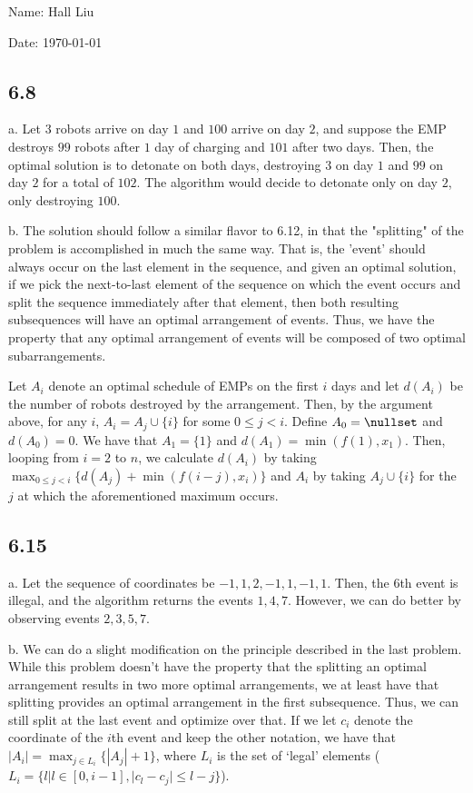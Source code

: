 \documentclass{article}
\begin{document}
Name: Hall Liu

Date: \today 

\subsection*{6.8}
a. Let $3$ robots arrive on day $1$ and $100$ arrive on day $2$, and suppose the EMP destroys $99$ robots after $1$ day of charging and $101$ after two days. Then, the optimal solution is to detonate on both days, destroying $3$ on day $1$ and $99$ on day $2$ for a total of $102$. The algorithm would decide to detonate only on day $2$, only destroying $100$.

\noindent b. The solution should follow a similar flavor to 6.12, in that the "splitting" of the problem is accomplished in much the same way. That is, the 'event' should always occur on the last element in the sequence, and given an optimal solution, if we pick the next-to-last element of the sequence on which the event occurs and split the sequence immediately after that element, then both resulting subsequences will have an optimal arrangement of events. Thus, we have the property that any optimal arrangement of events will be composed of two optimal subarrangements.

Let $A_i$ denote an optimal schedule of EMPs on the first $i$ days and let $d(A_i)$ be the number of robots destroyed by the arrangement. Then, by the argument above, for any $i$, $A_i=A_j\cup\{i\}$ for some $0\leq j<i$. Define $A_0=\nullset$ and $d(A_0)=0$. We have that $A_1=\{1\}$ and $d(A_1)=\min(f(1),x_1)$. Then, looping from $i=2$ to $n$, we calculate $d(A_i)$ by taking $\displaystyle\max_{0\leq j<i}\{d(A_j)+\min(f(i-j),x_i)\}$ and $A_i$ by taking $A_j\cup\{i\}$ for the $j$ at which the aforementioned maximum occurs.
\subsection*{6.15}
a. Let the sequence of coordinates be $-1,1,2,-1,1,-1,1$. Then, the $6$th event is illegal, and the algorithm returns the events $1,4,7$. However, we can do better by observing events $2,3,5,7$. 

\noindent b. We can do a slight modification on the principle described in the last problem. While this problem doesn't have the property that the splitting an optimal arrangement results in two more optimal arrangements, we at least have that splitting provides an optimal arrangement in the first subsequence. Thus, we can still split at the last event and optimize over that. If we let $c_i$ denote the coordinate of the $i$th event and keep the other notation, we have that $\displaystyle|A_i|=\max_{j\in L_i}\{|A_j|+1\}$, where $L_i$ is the set of `legal' elements ($L_i=\{l|l\in[0,i-1],|c_l-c_j|\leq l-j\}$). 
\end{document}
